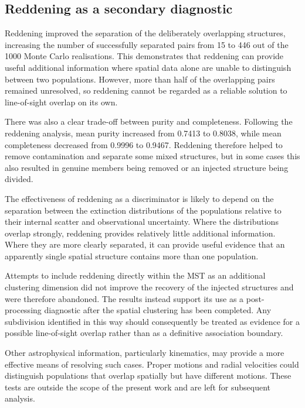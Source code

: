 \documentclass[fleqn,usenatbib]{mnras}
\begin{document}
\subsection{Reddening as a secondary diagnostic}

Reddening improved the separation of the deliberately overlapping structures, increasing the number of successfully separated pairs from 15 to 446 out of the 1000 Monte Carlo realisations. This demonstrates that reddening can provide useful additional information where spatial data alone are unable to distinguish between two populations. However, more than half of the overlapping pairs remained unresolved, so reddening cannot be regarded as a reliable solution to line-of-sight overlap on its own.

There was also a clear trade-off between purity and completeness. Following the reddening analysis, mean purity increased from 0.7413 to 0.8038, while mean completeness decreased from 0.9996 to 0.9467. Reddening therefore helped to remove contamination and separate some mixed structures, but in some cases this also resulted in genuine members being removed or an injected structure being divided.

The effectiveness of reddening as a discriminator is likely to depend on the separation between the extinction distributions of the populations relative to their internal scatter and observational uncertainty. Where the distributions overlap strongly, reddening provides relatively little additional information. Where they are more clearly separated, it can provide useful evidence that an apparently single spatial structure contains more than one population.

Attempts to include reddening directly within the MST as an additional clustering dimension did not improve the recovery of the injected structures and were therefore abandoned. The results instead support its use as a post-processing diagnostic after the spatial clustering has been completed. Any subdivision identified in this way should consequently be treated as evidence for a possible line-of-sight overlap rather than as a definitive association boundary.

Other astrophysical information, particularly kinematics, may provide a more effective means of resolving such cases. Proper motions and radial velocities could distinguish populations that overlap spatially but have different motions. These tests are outside the scope of the present work and are left for subsequent analysis.
\end{document}
